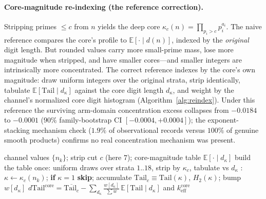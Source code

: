 \documentclass[12pt]{article}
\newcommand{\keff}{k_{\mathrm{eff}}}
\begin{document}
\paragraph{Core-magnitude re-indexing (the reference correction).}
Stripping primes $\le c$ from $n$ yields the deep core
$\kappa_c(n) = \prod_{p_i > c} p_i^{a_i}$. The naive reference compares the
core's profile to $\mathbb{E}[\cdot \mid d(n)]$, indexed by the
\emph{original} digit length. But rounded values carry more small-prime mass,
lose more magnitude when stripped, and have smaller cores---and smaller
integers are intrinsically more concentrated. The correct reference indexes by
the core's own magnitude: draw uniform integers over the original strata,
strip identically, tabulate $\mathbb{E}[\mathrm{Tail} \mid d_\kappa]$ against
the core digit length $d_\kappa$, and weight by the channel's normalized core
digit histogram (Algorithm~\ref{alg:reindex}). Under this reference the
surviving arm-domain concentration excess collapses from $-0.0184$ to
$-0.0001$ ($90\%$ family-bootstrap CI $[-0.0004, +0.0004]$); the
exponent-stacking mechanism check ($1.9\%$ of observational records versus
$100\%$ of genuine smooth products) confirms no real concentration mechanism
was present.

\begin{algorithm}[t]
\caption{Core-magnitude re-indexing}
\label{alg:reindex}
\begin{algorithmic}[1]
\Require channel values $\{n_k\}$; strip cut $c$ (here $7$); core-magnitude table $\mathbb{E}[\cdot\mid d_\kappa]$
\State build the table once: uniform draws over strata $1..18$, strip by $\kappa_c$, tabulate vs $d_\kappa$
: $\kappa\gets\kappa_c(n_k)$; \textbf{if} $\kappa=1$ \textbf{skip}; accumulate $\mathrm{Tail}_c \equiv \mathrm{Tail}(\kappa)$, $H_2(\kappa)$; bump $w[d_\kappa]$
\EndFor
\State \Return $d\mathrm{Tail}^{\mathrm{core}} = \overline{\mathrm{Tail}_c} - \sum_{d_\kappa} \tfrac{w[d_\kappa]}{\sum w}\,\mathbb{E}[\mathrm{Tail}\mid d_\kappa]$ and $\keff^{\mathrm{core}}$
\end{algorithmic}
\end{algorithm}
\end{document}
